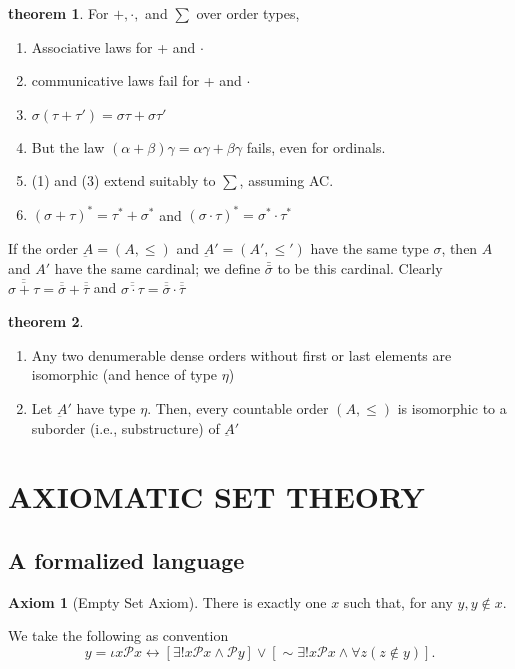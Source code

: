 \documentclass[a4paper,11pt]{article}%
\theoremstyle{remark}
\theoremstyle{definition}
\newtheorem{theorem}{theorem}[section]
\theoremstyle{definition}
\theoremstyle{plain}
\theoremstyle{definition}
\newtheorem{axiom}{Axiom}
\begin{document}
\begin{theorem}
    For $+,\cdot,$ and $\sum$ over order types, 
    \begin{enumerate}
        \item Associative laws for + and $\cdot$
        \item communicative laws fail for + and $\cdot$
        \item $\sigma(\tau+\tau')=\sigma\tau+\sigma\tau'$
        \item But the law $(\alpha+\beta)\gamma=\alpha\gamma+\beta\gamma$ fails, even for ordinals.
        \item (1) and (3) extend suitably to $\sum$, assuming AC.
        \item $(\sigma+\tau)^*=\tau^*+\sigma^*$ and $(\sigma\cdot\tau)^*=\sigma^*\cdot\tau^*$
    \end{enumerate}
\end{theorem}
If the order $\underbar{A}=(A,\leq)$ and $\underbar{A}'=(A',\leq')$ have the same
type $\sigma$, then $A$ and $A'$ have the same cardinal; we define $\bar{\bar{\sigma}}$ to be this cardinal.
Clearly $\overline{\overline{\sigma+\tau}}=\overline{\overline{\sigma}}+\overline{\overline{\tau}}$ and $\overline{\overline{\sigma\cdot\tau}}=\overline{\overline{\sigma}}\cdot \overline{\overline{\tau}}$
\begin{theorem}
    \begin{enumerate}
        \item Any two denumerable dense orders without first or last elements are isomorphic (and hence of type $\eta$)
        \item Let $\underbar{A}'$ have type $\eta$. Then, every countable order $(A,\leq)$ is isomorphic to a suborder (i.e., substructure) of $\underbar{A}'$
    \end{enumerate}
\end{theorem}
\section{AXIOMATIC SET THEORY}
\subsection{A formalized language}
\begin{axiom}[Empty Set Axiom]
    There is exactly one $x$ such that, for any $y,y\notin x$.
\end{axiom}
We take the following as convention
\[y=\iota x\mathcal{P}x\leftrightarrow [\exists!x\mathcal{P}x\land\mathcal{P}y]\lor[\sim\exists!x\mathcal{P}x\land\forall z(z\notin y)]. \]
\end{document}

